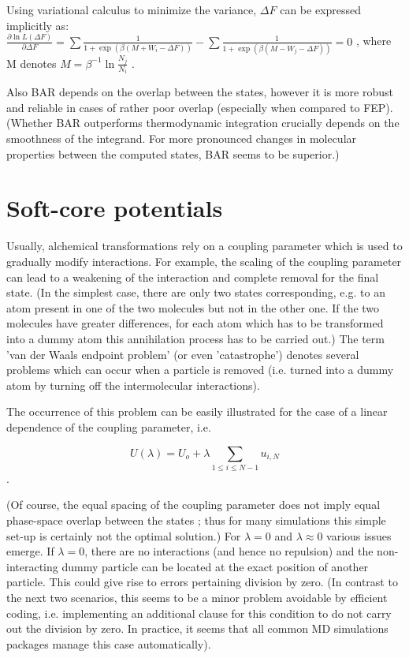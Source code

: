 Using variational calculus to minimize the variance, $\Delta F$ can
be expressed implicitly as:$\frac{\partial\ln L\left(\Delta F\right)}{\partial\Delta F}=\sum\frac{1}{1+\exp\left(\beta\left(M+W_{i}-\Delta F\right)\right)}-\sum\frac{1}{1+\exp\left(\beta\left(M-W_{j}-\Delta F\right)\right)}=0$
, where M denotes $M=\beta^{-1}\ln\frac{N_{j}}{N_{i}}$ \cite{Shirts.2003}.

Also BAR depends on the overlap between the states, however it is
more robust and reliable in cases of rather poor overlap \cite{Ruiter.2013}
(especially when compared to FEP). (Whether BAR outperforms thermodynamic
integration crucially depends on the smoothness of the integrand.
For more pronounced changes in molecular properties between the computed
states, BAR seems to be superior\cite{Shirts.2013}.)

\section{Soft-core potentials}

Usually, alchemical transformations rely on a coupling parameter which
is used to gradually modify interactions. For example, the scaling of the coupling parameter can lead to a weakening of the interaction and complete removal for the final state. (In the simplest case,
there are only two states corresponding, e.g. to an atom present in
one of the two molecules but not in the other one. If the two molecules
have greater differences, for each atom which has to be transformed
into a dummy atom this annihilation process has to be carried out.)
The term 'van der Waals endpoint problem' (or even 'catastrophe') denotes
several problems which can occur when a particle is removed (i.e.
turned into a dummy atom by turning off the intermolecular interactions).
\cite{Boresch.2011}

The occurrence of this problem can be easily illustrated for the case
of a linear dependence of the coupling parameter,
i.e.

\[
U\left(\lambda\right)=U_{o}+\lambda\sum_{1\leq i\leq N-1}u_{i,N}
\]
.

(Of course, the equal spacing of the coupling parameter does not imply
equal phase-space overlap between the states \cite{Shirts.2013};
thus for many simulations this simple set-up is certainly not the
optimal solution.) For $\lambda=0$ and $\lambda\approx0$ various
issues emerge. If $\lambda=0$, there are no interactions (and hence
no repulsion) and the non-interacting dummy particle can be located
at the exact position of another particle. This could give rise to
errors pertaining division by zero. (In contrast to the next two scenarios,
this seems to be a minor problem avoidable by efficient coding, i.e.
implementing an additional clause for this condition to do not carry
out the division by zero. In practice, it seems that all common MD
simulations packages manage this case automatically\cite{Boresch.2011}).

